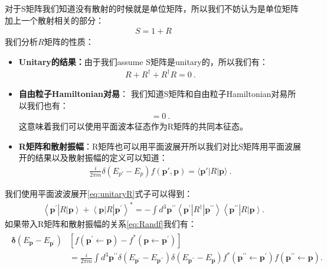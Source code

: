   对于S矩阵我们知道没有散射的时候就是单位矩阵，所以我们不妨认为是单位矩阵加上一个散射相关的部分：
  \begin{align}
    S= 1+R
  \end{align}
  我们分析$ R $矩阵的性质：
  \begin{itemize}
    \item \textbf{Unitary的结果：}由于我们assume S矩阵是unitary的，所以我们有：
      \begin{align}\label{eq:unitaryR}
        R+R^\dagger+R^\dagger R=0\mathrm{~.}
      \end{align}
    \item \textbf{自由粒子Hamiltonian对易}： 我们知道S矩阵和自由粒子Hamiltonian对易所以我们也有：
      \begin{align}
        [R,H_0]=0\mathrm{~.}
      \end{align}
      这意味着我们可以使用平面波本征态作为R矩阵的共同本征态。
    \item \textbf{R矩阵和散射振幅}：R矩阵也可以用平面波展开所以我们对比S矩阵用平面波展开的结果以及散射振幅的定义可以知道：
      \begin{align}\label{eq:Randf}
        \displaystyle\frac{i}{2 \pi m} \delta(E_{p'} - E_p)
        f(\mathbf{p}', \mathbf{p}) = \langle \mathbf{p}' | R |
        \mathbf{p} \rangle \mathrm{~.}
      \end{align}
  \end{itemize}
  我们使用平面波波展开\cref{eq:unitaryR}式子可以得到：
  \begin{align}
    \left\langle\mathbf{p}^{\prime}\right|R\left|\mathbf{p}\right\rangle+\left\langle\mathbf{p}\right|R\left|\mathbf{p}^{\prime}\right\rangle^*=-\int
    d^3\mathbf{p}^{\prime\prime}\left\langle\mathbf{p}^{\prime}\right|R^\dagger\left|\mathbf{p}^{\prime\prime}\right\rangle\left\langle\mathbf{p}^{\prime\prime}\right|R\left|\mathbf{p}\right\rangle.
  \end{align}
  如果带入R矩阵和散射振幅的关系\cref{eq:Randf}我们有：
  \begin{align}\label{eq:opticaltheorem1}
    \begin{aligned}\boldsymbol{\delta}\left(E_{\mathbf{p}}-E_{\mathbf{p}^{\prime}}\right)&\left[f\left(\mathbf{p}^{\prime}\leftarrow\mathbf{p}\right)-f^*\left(\mathbf{p}\leftarrow\mathbf{p}^{\prime}\right)\right]\\&=\frac{i}{2\pi
      m}\int
      d^3\mathbf{p}^{\prime\prime}\delta\left(E_{\mathbf{p}^{\prime}}-E_{\mathbf{p}^{\prime\prime}}\right){\delta}\left(E_{\mathbf{p}^{\prime\prime}}-E_{\mathbf{p}}\right)f^*\left(\mathbf{p}^{\prime\prime}\leftarrow\mathbf{p}^{\prime}\right)f\left(\mathbf{p}^{\prime\prime}\leftarrow\mathbf{p}\right).
    \end{aligned}
  \end{align}

